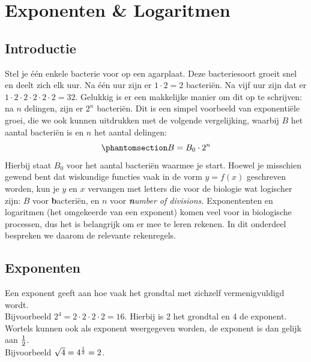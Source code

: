 \documentclass[
  a4paper,
]{scrbook}
\theoremstyle{definition}
\theoremstyle{remark}
\begin{document}
\chapter{Exponenten \& Logaritmen}\label{sec-exponenten}

\section{Introductie}\label{introductie-2}

Stel je één enkele bacterie voor op een agarplaat. Deze bacteriesoort
groeit snel en deelt zich elk uur. Na één uur zijn er \(1 \cdot 2 = 2\)
bacteriën. Na vijf uur zijn dat er
\(1 \cdot 2 \cdot 2 \cdot 2 \cdot 2 \cdot 2 = 32\). Gelukkig is er een
makkelijke manier om dit op te schrijven: na \(n\) delingen, zijn er
\(2^n\) bacteriën. Dit is een simpel voorbeeld van exponentiële groei,
die we ook kunnen uitdrukken met de volgende vergelijking, waarbij \(B\)
het aantal bacteriën is en \(n\) het aantal delingen:
\begin{equation}\phantomsection\label{eq-bact-groei}{
B = B_0\cdot2^n
}\end{equation} Hierbij staat \(B_0\) voor het aantal bacteriën waarmee
je start. Hoewel je misschien gewend bent dat wiskundige functies vaak
in de vorm \(y=f(x)\) geschreven worden, kun je \(y\) en \(x\) vervangen
met letters die voor de biologie wat logischer zijn: \(B\) voor
\textbf{b}acteriën, en \(n\) voor \emph{\textbf{n}umber of divisions.}
Exponententen en logaritmen (het omgekeerde van een exponent) komen veel
voor in biologische processen, dus het is belangrijk om er mee te leren
rekenen. In dit onderdeel bespreken we daarom de relevante rekenregels.

\section{Exponenten}\label{exponenten}

Een exponent geeft aan hoe vaak het grondtal met zichzelf
vermenigvuldigd wordt.\\
Bijvoorbeeld \(2^4 = 2 \cdot 2 \cdot 2 \cdot 2 = 16\). Hierbij is 2 het
grondtal en 4 de exponent.\\
Wortels kunnen ook als exponent weergegeven worden, de exponent is dan
gelijk aan \(1\over2\).\\
Bijvoorbeeld \(\sqrt{4} = 4^{1\over2} = 2\).
\end{document}
